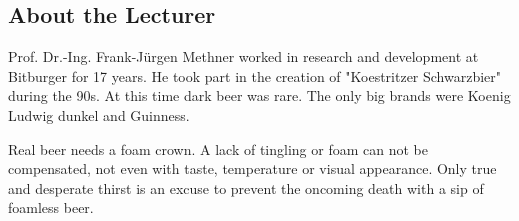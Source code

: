 \documentclass[]{scrartcl}
\begin{document}
\subsection{About the Lecturer}
Prof. Dr.-Ing. Frank-Jürgen Methner worked in research and development at Bitburger for 17 years.
He took part in the creation of "Koestritzer Schwarzbier" during the 90s.
At this time dark beer was rare. The only big brands were Koenig Ludwig dunkel and
Guinness.

Real beer needs a foam crown. A lack of tingling or foam can not be compensated,
not even with taste, temperature or visual appearance. Only true and desperate
thirst is an excuse to prevent the oncoming death with a sip of foamless beer.
\end{document}
